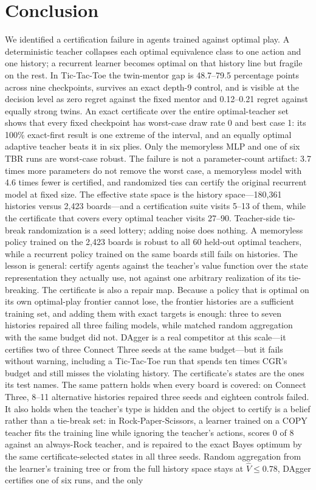 \documentclass[conference]{IEEEtran}
\begin{document}
\section{Conclusion}
\label{sec:conclusion}

We identified a certification failure in agents trained against optimal play. A deterministic teacher collapses each optimal equivalence class to one action and one history; a recurrent learner becomes optimal on that history line but fragile on the rest. In Tic-Tac-Toe the twin-mentor gap is 48.7--79.5 percentage points across nine checkpoints, survives an exact depth-9 control, and is visible at the decision level as zero regret against the fixed mentor and 0.12--0.21 regret against equally strong twins. An exact certificate over the entire optimal-teacher set shows that every fixed checkpoint has worst-case draw rate 0 and best case 1: its 100\% exact-first result is one extreme of the interval, and an equally optimal adaptive teacher beats it in six plies. Only the memoryless MLP and one of six TBR runs are worst-case robust. The failure is not a parameter-count artifact: 3.7 times more parameters do not remove the worst case, a memoryless model with 4.6 times fewer is certified, and randomized ties can certify the original recurrent model at fixed size. The effective state space is the history space---180{,}361 histories versus 2{,}423 boards---and a certification suite visits 5--13 of them, while the certificate that covers every optimal teacher visits 27--90. Teacher-side tie-break randomization is a seed lottery; adding noise does nothing. A memoryless policy trained on the 2{,}423 boards is robust to all 60 held-out optimal teachers, while a recurrent policy trained on the same boards still fails on histories. The lesson is general: certify agents against the teacher's value function over the state representation they actually use, not against one arbitrary realization of its tie-breaking. The certificate is also a repair map. Because a policy that is optimal on its own optimal-play frontier cannot lose, the frontier histories are a sufficient training set, and adding them with exact targets is enough: three to seven histories repaired all three failing models, while matched random aggregation with the same budget did not. DAgger is a real competitor at this scale---it certifies two of three Connect Three seeds at the same budget---but it fails without warning, including a Tic-Tac-Toe run that spends ten times CGR's budget and still misses the violating history. The certificate's states are the ones its test names. The same pattern holds when every board is covered: on Connect Three, 8--11 alternative histories repaired three seeds and eighteen controls failed. It also holds when the teacher's type is hidden and the object to certify is a belief rather than a tie-break set: in Rock-Paper-Scissors, a learner trained on a COPY teacher fits the training line while ignoring the teacher's actions, scores 0 of 8 against an always-Rock teacher, and is repaired to the exact Bayes optimum by the same certificate-selected states in all three seeds. Random aggregation from the learner's training tree or from the full history space stays at $\hat V\le0.78$, DAgger certifies one of six runs, and the only 
\end{document}
